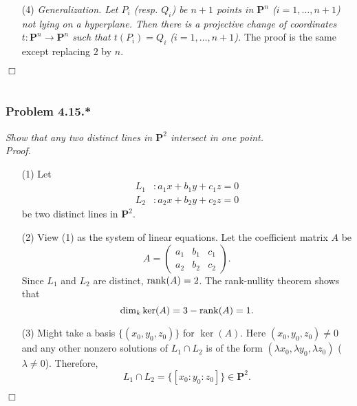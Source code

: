 \documentclass{article}
\begin{document}
\begin{enumerate}
\item[(4)]
  \emph{Generalization.
  Let $P_i$ (resp. $Q_i$) be $n+1$ points in $\mathbf{P}^n$ ($i = 1, \ldots, n+1$)
  not lying on a hyperplane.
  Then there is a projective change of coordinates
  $t: \mathbf{P}^n \to \mathbf{P}^n$ such that $t(P_i) = Q_i$ ($i = 1, \ldots, n+1$).}
  The proof is the same except replacing $2$ by $n$.
\end{enumerate}
$\Box$ \\\\






\subsubsection*{Problem 4.15.*}
\emph{Show that any two distinct lines in $\mathbf{P}^2$ intersect in one point.} \\



\emph{Proof.}
\begin{enumerate}
\item[(1)]
  Let
  \begin{align*}
    L_1 &: a_1 x + b_1 y + c_1 z = 0 \\
    L_2 &: a_2 x + b_2 y + c_2 z = 0
  \end{align*}
  be two distinct lines in $\mathbf{P}^2$.

\item[(2)]
  View (1) as the system of linear equations.
  Let the coefficient matrix $A$ be
  \[
    A
    =
    \begin{pmatrix}
      a_1 & b_1 & c_1 \\
      a_2 & b_2 & c_2
    \end{pmatrix}.
  \]
  Since $L_1$ and $L_2$ are distinct, $\rank(A) = 2$.
  The rank-nullity theorem shows that
  \[
    \dim_k \ker(A) = 3 - \rank(A) = 1.
  \]

\item[(3)]
  Might take a basis $\{ (x_0, y_0, z_0) \}$ for $\ker(A)$.
  Here $(x_0, y_0, z_0) \neq 0$ and
  any other nonzero solutions of $L_1 \cap L_2$ is of the form
  $(\lambda x_0, \lambda y_0, \lambda z_0)$ ($\lambda \neq 0$).
  Therefore,
  \[
    L_1 \cap L_2 = \{ [x_0:y_0:z_0] \} \in \mathbf{P}^2.
  \]
\end{enumerate}
$\Box$ \\\\
\end{document}
